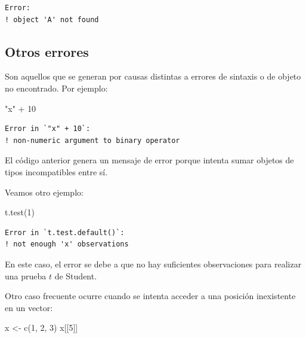 \documentclass[
  spanish,
  a4paper,
]{scrbook}
\newenvironment{Shaded}{\begin{snugshade}}{\end{snugshade}}
\newcommand{\DecValTok}[1]{\textcolor[rgb]{0.68,0.00,0.00}{#1}}
\newcommand{\FunctionTok}[1]{\textcolor[rgb]{0.28,0.35,0.67}{#1}}
\newcommand{\NormalTok}[1]{\textcolor[rgb]{0.00,0.23,0.31}{#1}}
\newcommand{\OtherTok}[1]{\textcolor[rgb]{0.00,0.23,0.31}{#1}}
\newcommand{\SpecialCharTok}[1]{\textcolor[rgb]{0.37,0.37,0.37}{#1}}
\newcommand{\StringTok}[1]{\textcolor[rgb]{0.13,0.47,0.30}{#1}}
\begin{document}
\begin{verbatim}
Error:
! object 'A' not found
\end{verbatim}

\subsection{Otros errores}\label{otros-errores}

Son aquellos que se generan por causas distintas a errores de sintaxis o
de objeto no encontrado. Por ejemplo:

\begin{Shaded}
\begin{Highlighting}[]
\StringTok{"x"} \SpecialCharTok{+} \DecValTok{10}
\end{Highlighting}
\end{Shaded}

\begin{verbatim}
Error in `"x" + 10`:
! non-numeric argument to binary operator
\end{verbatim}

El código anterior genera un mensaje de error porque intenta sumar
objetos de tipos incompatibles entre sí.

Veamos otro ejemplo:

\begin{Shaded}
\begin{Highlighting}[]
\FunctionTok{t.test}\NormalTok{(}\DecValTok{1}\NormalTok{)}
\end{Highlighting}
\end{Shaded}

\begin{verbatim}
Error in `t.test.default()`:
! not enough 'x' observations
\end{verbatim}

En este caso, el error se debe a que no hay suficientes observaciones
para realizar una prueba \(t\) de Student.

Otro caso frecuente ocurre cuando se intenta acceder a una posición
inexistente en un vector:

\begin{Shaded}
\begin{Highlighting}[]
\NormalTok{x }\OtherTok{\textless{}{-}} \FunctionTok{c}\NormalTok{(}\DecValTok{1}\NormalTok{, }\DecValTok{2}\NormalTok{, }\DecValTok{3}\NormalTok{)}
\NormalTok{x[[}\DecValTok{5}\NormalTok{]]}
\end{Highlighting}
\end{Shaded}
\end{document}
